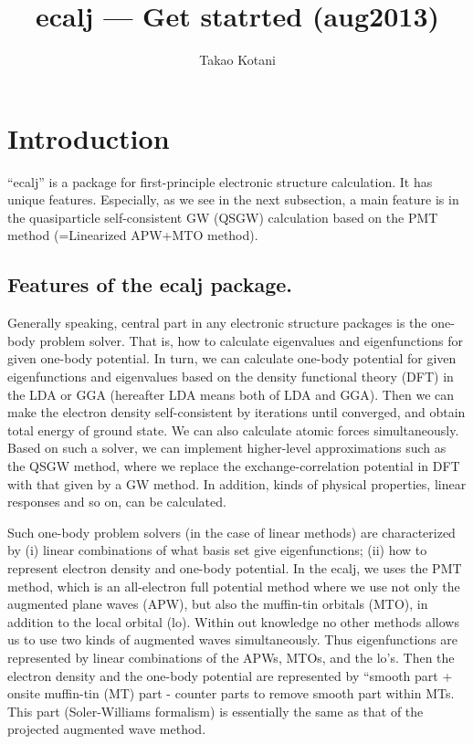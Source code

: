 \documentclass[a4paper,10pt,epsf,fleqn]{article}
\author{Takao Kotani}
\title{ecalj --- Get statrted (aug2013)}
\begin{document}
\maketitle
\tableofcontents
\newpage
\section{Introduction}
``ecalj'' is a package for first-principle electronic structure
calculation. It has unique features. 
Especially, as we see in the next subsection,
a main feature is in the quasiparticle self-consistent GW (QSGW)
calculation based on the PMT method (=Linearized APW+MTO method).


\subsection{Features of the ecalj package.}
Generally speaking, central part in any electronic structure
packages is the one-body problem solver. 
That is, how to calculate eigenvalues and eigenfunctions for given one-body
potential. In turn, we can calculate one-body potential 
for given eigenfunctions and eigenvalues
based on the density functional theory (DFT) in the LDA or GGA
(hereafter LDA means both of LDA and GGA).
Then we can make the electron density self-consistent by iterations
until converged, and obtain total energy of ground state.
We can also calculate atomic forces simultaneously.
Based on such a solver, we can implement 
higher-level approximations such as the QSGW method, where we replace
the exchange-correlation potential in DFT with that given by a GW method.
In addition, kinds of physical properties, linear responses and so on, 
can be calculated.

Such one-body problem solvers (in the case of linear methods) are
characterized by (i) linear combinations of what basis set give eigenfunctions; 
(ii) how to represent electron density and one-body potential.
In the ecalj, we uses the PMT method, which is an
all-electron full potential method where we use not only the
augmented plane waves (APW), but also the muffin-tin orbitals (MTO),
in addition to the local orbital (lo). Within out knowledge no other
methods allows us to use two kinds of augmented waves simultaneously.
Thus eigenfunctions are represented by linear combinations of the
APWs, MTOs, and the lo's.
Then the electron density and the one-body potential are represented
by ``smooth part + onsite muffin-tin (MT) part - counter parts to
remove smooth part within MTs.
This part (Soler-Williams formalism) is essentially 
the same as that of the projected augmented wave method.
\end{document}
